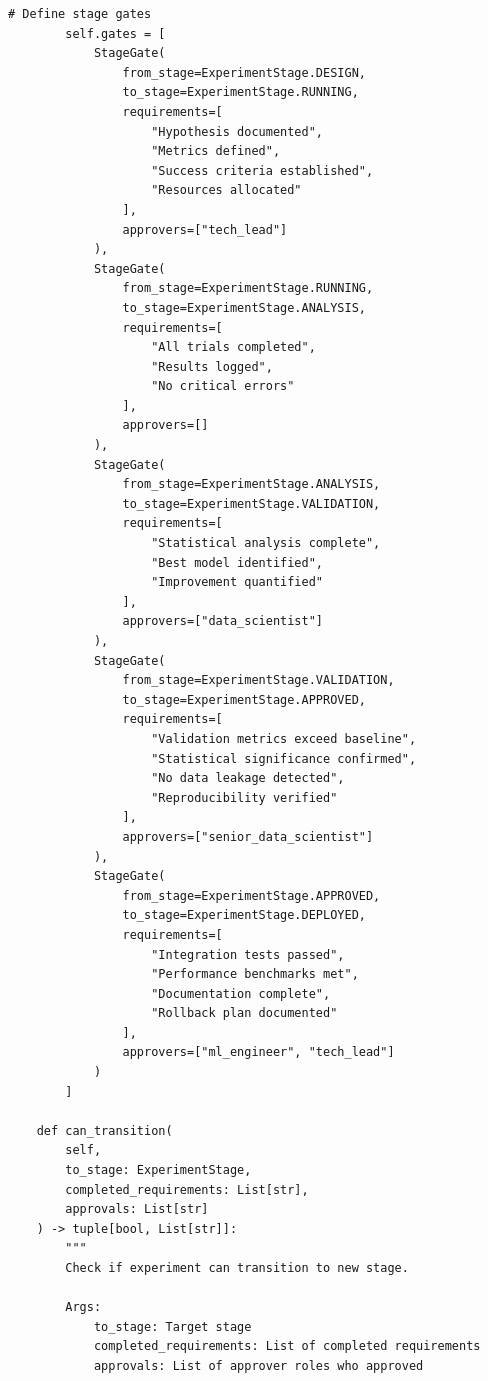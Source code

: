 \begin{lstlisting}[style=python, caption={Experiment lifecycle management}]
        # Define stage gates
        self.gates = [
            StageGate(
                from_stage=ExperimentStage.DESIGN,
                to_stage=ExperimentStage.RUNNING,
                requirements=[
                    "Hypothesis documented",
                    "Metrics defined",
                    "Success criteria established",
                    "Resources allocated"
                ],
                approvers=["tech_lead"]
            ),
            StageGate(
                from_stage=ExperimentStage.RUNNING,
                to_stage=ExperimentStage.ANALYSIS,
                requirements=[
                    "All trials completed",
                    "Results logged",
                    "No critical errors"
                ],
                approvers=[]
            ),
            StageGate(
                from_stage=ExperimentStage.ANALYSIS,
                to_stage=ExperimentStage.VALIDATION,
                requirements=[
                    "Statistical analysis complete",
                    "Best model identified",
                    "Improvement quantified"
                ],
                approvers=["data_scientist"]
            ),
            StageGate(
                from_stage=ExperimentStage.VALIDATION,
                to_stage=ExperimentStage.APPROVED,
                requirements=[
                    "Validation metrics exceed baseline",
                    "Statistical significance confirmed",
                    "No data leakage detected",
                    "Reproducibility verified"
                ],
                approvers=["senior_data_scientist"]
            ),
            StageGate(
                from_stage=ExperimentStage.APPROVED,
                to_stage=ExperimentStage.DEPLOYED,
                requirements=[
                    "Integration tests passed",
                    "Performance benchmarks met",
                    "Documentation complete",
                    "Rollback plan documented"
                ],
                approvers=["ml_engineer", "tech_lead"]
            )
        ]

    def can_transition(
        self,
        to_stage: ExperimentStage,
        completed_requirements: List[str],
        approvals: List[str]
    ) -> tuple[bool, List[str]]:
        """
        Check if experiment can transition to new stage.

        Args:
            to_stage: Target stage
            completed_requirements: List of completed requirements
            approvals: List of approver roles who approved


\end{lstlisting}

